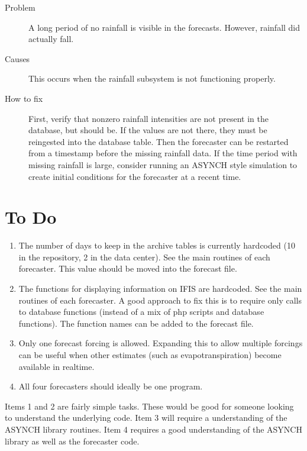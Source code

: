 \documentclass[12pt]{article}
\begin{document}
\vspace{.1in}
\begin{description}
 \item[Problem] A long period of no rainfall is visible in the forecasts. However, rainfall did actually fall.
 \item[Causes] This occurs when the rainfall subsystem is not functioning properly.
 \item[How to fix] First, verify that nonzero rainfall intensities are not present in the database, but should be. If the values are not there, they must be reingested into the database table. Then the forecaster can be restarted from a timestamp before the missing rainfall data. If the time period with missing rainfall is large, consider running an ASYNCH style simulation to create initial conditions for the forecaster at a recent time.
\end{description}


\section{To Do} \label{sec: to do}

\begin{enumerate}
 \item The number of days to keep in the archive tables is currently hardcoded (10 in the repository, 2 in the data center). See the main routines of each forecaster. This value should be moved into the forecast file.
 \item The functions for displaying information on IFIS are hardcoded. See the main routines of each forecaster. A good approach to fix this is to require only calls to database functions (instead of a mix of php scripts and database functions). The function names can be added to the forecast file.
 \item Only one forecast forcing is allowed. Expanding this to allow multiple forcings can be useful when other estimates (such as evapotranspiration) become available in realtime.
 \item All four forecasters should ideally be one program.
\end{enumerate}

Items 1 and 2 are fairly simple tasks. These would be good for someone looking to understand the underlying code. Item 3 will require a understanding of the ASYNCH library routines. Item 4 requires a good understanding of the ASYNCH library as well as the forecaster code.
\end{document}
